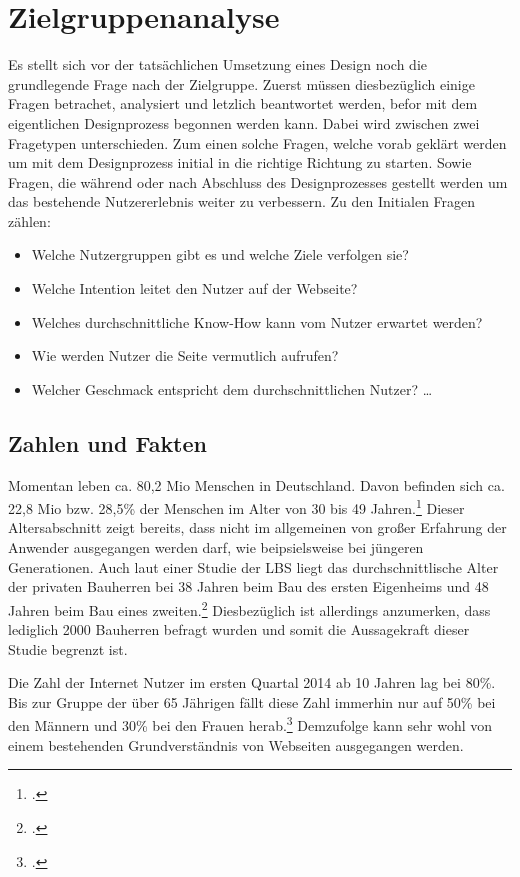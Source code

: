 \section{Zielgruppenanalyse}
Es stellt sich vor der tatsächlichen Umsetzung eines Design noch die grundlegende Frage nach der Zielgruppe. Zuerst müssen diesbezüglich einige Fragen betrachet, analysiert und letzlich beantwortet werden, befor mit dem eigentlichen Designprozess begonnen werden kann. Dabei wird zwischen zwei Fragetypen unterschieden. Zum einen solche Fragen, welche vorab geklärt werden um mit dem Designprozess initial in die richtige Richtung zu starten. Sowie Fragen, die während oder nach Abschluss des Designprozesses gestellt werden um das bestehende Nutzererlebnis weiter zu verbessern.
Zu den Initialen Fragen zählen: 
\begin{itemize}
	\item Welche Nutzergruppen gibt es und welche Ziele verfolgen sie?
	\item Welche Intention leitet den Nutzer auf der Webseite?
	\item Welches durchschnittliche Know-How kann vom Nutzer erwartet werden? 
	\item Wie werden Nutzer die Seite vermutlich aufrufen? 
	\item Welcher Geschmack entspricht dem durchschnittlichen Nutzer? \ldots
\end{itemize}
\subsection{Zahlen und Fakten}
Momentan leben ca. 80,2 Mio Menschen in Deutschland. Davon befinden sich ca. 22,8 Mio bzw. 28,5\% der Menschen im Alter von 30 bis 49 Jahren.\footcite[vgl.][]{zensus2011:alter} Dieser Altersabschnitt zeigt bereits, dass nicht im allgemeinen von großer Erfahrung der Anwender ausgegangen werden darf, wie beipsielsweise bei jüngeren Generationen. Auch laut einer Studie der LBS liegt das durchschnittlische Alter der privaten Bauherren bei 38 Jahren beim Bau des ersten Eigenheims und 48 Jahren beim Bau eines zweiten.\footcite[vgl.][]{lbs} Diesbezüglich ist allerdings anzumerken, dass lediglich 2000 Bauherren befragt wurden und somit die Aussagekraft dieser Studie begrenzt ist.

Die Zahl der Internet Nutzer im ersten Quartal 2014 ab 10 Jahren lag bei 80\%. Bis zur Gruppe der über 65 Jährigen fällt diese Zahl immerhin nur auf 50\% bei den Männern und 30\% bei den Frauen herab.\footcite[vgl.][]{stabu} Demzufolge kann sehr wohl von einem bestehenden Grundverständnis von Webseiten ausgegangen werden. 

